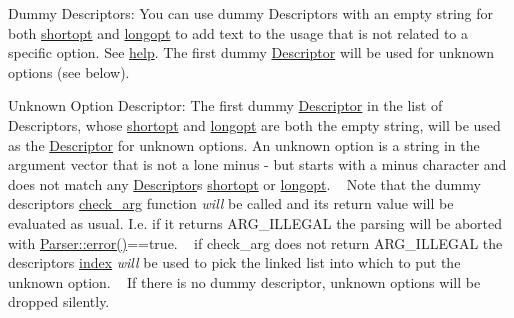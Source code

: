\begin{DoxyParagraph}{Dummy Descriptors\+:}
You can use dummy Descriptors with an empty string for both \hyperlink{structxmem_1_1config_1_1third__party_1_1_descriptor_ac2dfb6bb8ca2f4aabf964a910cf0d59b}{shortopt} and \hyperlink{structxmem_1_1config_1_1third__party_1_1_descriptor_a7246a4bfc669f68bb406dece398be7bb}{longopt} to add text to the usage that is not related to a specific option. See \hyperlink{structxmem_1_1config_1_1third__party_1_1_descriptor_a099340907003981132a053856dac0eaa}{help}. The first dummy \hyperlink{structxmem_1_1config_1_1third__party_1_1_descriptor}{Descriptor} will be used for unknown options (see below).
\end{DoxyParagraph}
\begin{DoxyParagraph}{Unknown Option Descriptor\+:}
The first dummy \hyperlink{structxmem_1_1config_1_1third__party_1_1_descriptor}{Descriptor} in the list of Descriptors, whose \hyperlink{structxmem_1_1config_1_1third__party_1_1_descriptor_ac2dfb6bb8ca2f4aabf964a910cf0d59b}{shortopt} and \hyperlink{structxmem_1_1config_1_1third__party_1_1_descriptor_a7246a4bfc669f68bb406dece398be7bb}{longopt} are both the empty string, will be used as the \hyperlink{structxmem_1_1config_1_1third__party_1_1_descriptor}{Descriptor} for unknown options. An unknown option is a string in the argument vector that is not a lone minus {\ttfamily \textquotesingle{}-\/\textquotesingle{}} but starts with a minus character and does not match any \hyperlink{structxmem_1_1config_1_1third__party_1_1_descriptor}{Descriptor}\textquotesingle{}s \hyperlink{structxmem_1_1config_1_1third__party_1_1_descriptor_ac2dfb6bb8ca2f4aabf964a910cf0d59b}{shortopt} or \hyperlink{structxmem_1_1config_1_1third__party_1_1_descriptor_a7246a4bfc669f68bb406dece398be7bb}{longopt}. ~\newline
Note that the dummy descriptor\textquotesingle{}s \hyperlink{structxmem_1_1config_1_1third__party_1_1_descriptor_a65b39f8d61de820bb5001d590e7dea5d}{check\+\_\+arg} function {\itshape will} be called and its return value will be evaluated as usual. I.\+e. if it returns A\+R\+G\+\_\+\+I\+L\+L\+E\+G\+A\+L the parsing will be aborted with {\ttfamily \hyperlink{classxmem_1_1config_1_1third__party_1_1_parser_a2c9fddb12fd9e4c735677e831afee138}{Parser\+::error()}==true}. ~\newline
if {\ttfamily check\+\_\+arg} does not return A\+R\+G\+\_\+\+I\+L\+L\+E\+G\+A\+L the descriptor\textquotesingle{}s \hyperlink{structxmem_1_1config_1_1third__party_1_1_descriptor_aacf3d44f35c61f22be65da078f60734b}{index} {\itshape will} be used to pick the linked list into which to put the unknown option. ~\newline
If there is no dummy descriptor, unknown options will be dropped silently. 
\end{DoxyParagraph}
\hypertarget{structxmem_1_1config_1_1third__party_1_1_descriptor_ac2dfb6bb8ca2f4aabf964a910cf0d59b}{}
